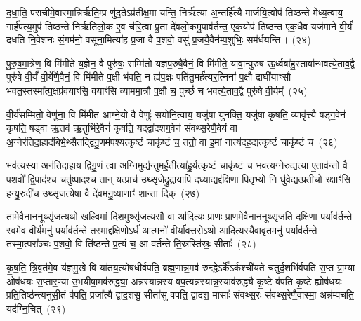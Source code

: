 द॒धा॒ति॒ परा॑चीमे॒वास्मा॒न्निर्\mbox{}ऋ॑ति॒म्प्र णु॑द॒ते\-ऽप्र॑तीक्ष॒मा य॑न्ति॒ निर्\mbox{}ऋ॑त्या अ॒न्तर्\mbox{}हि॑त्यै मार्जयि॒त्वोप॑ तिष्ठन्ते मेध्य॒त्वाय॒ गार्\mbox{}ह॑पत्य॒मुप॑ तिष्ठन्ते निर्\mbox{}ऋतिलो॒क ए॒व च॑रि॒त्वा पू॒ता दे॑वलो॒कमु॒पाव॑र्तन्त॒ एक॒योप॑ तिष्ठन्त एक॒धैव यज॑माने वी॒र्यं॑ दधति नि॒वेश॑नः सं॒गम॑नो॒ वसू॑ना॒मित्या॑ह प्र॒जा वै प॒शवो॒ वसु॑ प्र॒जयै॒वैन॑म्प॒शुभिः॒ सम॑र्धयन्ति॥~(२४)

{\anuvakamend[{ऋ॒तुभि॑रे॒षा परा॑ची॒रुपा॒ष्टाच॑त्वारिꣳशच्च}]}%

पु॒रु॒ष॒मा॒त्रेण॒ वि मि॑मीते य॒ज्ञेन॒ वै पुरु॑षः॒ सम्मि॑तो यज्ञप॒रुषै॒वैनं॒ वि मि॑मीते॒ यावा॒न्पुरु॑ष ऊ॒र्ध्वबा॑हु॒स्तावा᳚न्भव\-त्ये॒ताव॒द्वै पुरु॑षे वी॒र्यं॑ वी॒र्ये॑णै॒वैनं॒ वि मि॑मीते प॒क्षी भ॑वति॒ न ह्य॑प॒क्षः पति॑तु॒मर्\mbox{}ह॑त्यर॒त्निना॑ प॒क्षौ द्राघी॑याꣳसौ भवत॒स्तस्मा᳚त्प॒क्षप्र॑वयाꣳसि॒ वयाꣳ॑सि व्याममा॒त्रौ प॒क्षौ च॒ पुच्छं॑ च भवत्ये॒ताव॒द्वै पुरु॑षे वी॒र्यम्᳚~(२५)

वी॒र्य॑सम्मितो॒ वेणु॑ना॒ वि मि॑मीत आग्ने॒यो वै वेणुः॑ सयोनि॒त्वाय॒ यजु॑षा युनक्ति॒ यजु॑षा कृषति॒ व्यावृ॑त्त्यै षड्ग॒वेन॑ कृषति॒ षड्वा ऋ॒तव॑ ऋ॒तुभि॑रे॒वैनं॑ कृषति॒ यद्द्वा॑दशग॒वेन॑ संवथ्स॒रेणै॒वेयं वा अ॒ग्नेर॑तिदा॒हाद॑बिभे॒थ्सैतद्द्वि॑गु॒णम॑पश्यत्कृ॒ष्टं चाकृ॑ष्टं च॒ ततो॒ वा इ॒मां नात्य॑दह॒द्यत्कृ॒ष्टं चाकृ॑ष्टं च~(२६)

भव॑त्य॒स्या अन॑तिदाहाय द्विगु॒णं त्वा अ॒ग्निमुद्य॑न्तुमर्\mbox{}ह॒तीत्या॑हु॒र्यत्कृ॒ष्टं चाकृ॑ष्टं च॒ भव॑त्य॒ग्नेरुद्य॑त्या ए॒ताव॑न्तो॒ वै प॒शवो᳚ द्वि॒पाद॑श्च॒ चतु॑ष्पादश्च॒ तान् यत्प्राच॑ उथ्सृ॒जेद्रु॒द्रायापि॑ दध्या॒द्यद्द॑क्षि॒णा पि॒तृभ्यो॒ नि धु॑वे॒द्यत्प्र॒तीचो॒ रक्षाꣳ॑सि हन्यु॒रुदी॑च॒ उथ्सृ॑जत्ये॒षा वै दे॑वमनु॒ष्याणाꣳ॑ शा॒न्ता दिक्~(२७)

तामे॒वैना॒ननूथ्सृ॑ज॒त्यथो॒ खल्वि॒मां दिश॒मुथ्सृ॑जत्य॒सौ वा आ॑दि॒त्यः प्रा॒णः प्रा॒णमे॒वैना॒ननूथ्सृ॑जति दक्षि॒णा प॒र्याव॑र्तन्ते॒ स्वमे॒व वी॒र्य॑मनु॑ प॒र्याव॑र्तन्ते॒ तस्मा॒द्दक्षि॒णो\-ऽर्ध॑ आ॒त्मनो॑ वी॒र्या॑वत्त॒रो\-ऽथो॑ आदि॒त्यस्यै॒वावृत॒मनु॑ प॒र्याव॑र्तन्ते॒ तस्मा॒त्परा᳚ञ्चः प॒शवो॒ वि ति॑ष्ठन्ते प्र॒त्यं च॒ आ व॑र्तन्ते ति॒स्रस्ति॑स्रः॒ सीताः᳚~(२८)

कृ॒ष॒ति॒ त्रि॒वृत॑मे॒व य॑ज्ञमु॒खे वि या॑तय॒त्योष॑धीर्वपति॒ ब्रह्म॒णान्न॒मव॑ रुन्द्धे॒\-ऽर्के᳚\-ऽर्कश्ची॑यते चतुर्द॒शभि॑र्वपति स॒प्त ग्रा॒म्या ओष॑धयः स॒प्तार॒ण्या उ॒भयी॑षा॒मव॑रुद्ध्या॒ अन्न॑स्यान्नस्य वप॒त्यन्न॑स्यान्न॒स्याव॑रुद्ध्यै कृ॒ष्टे व॑पति कृ॒ष्टे ह्योष॑धयः प्रति॒तिष्ठ॑न्त्यनुसी॒तं व॑पति॒ प्रजा᳚त्यै द्वाद॒शसु॒ सीता॑सु वपति॒ द्वाद॑श॒ मासाः᳚ संवथ्स॒रः सं॑वथ्स॒रेणै॒वास्मा॒ अन्न॑म्पचति॒ यद॑ग्नि॒चित्~(२९)


